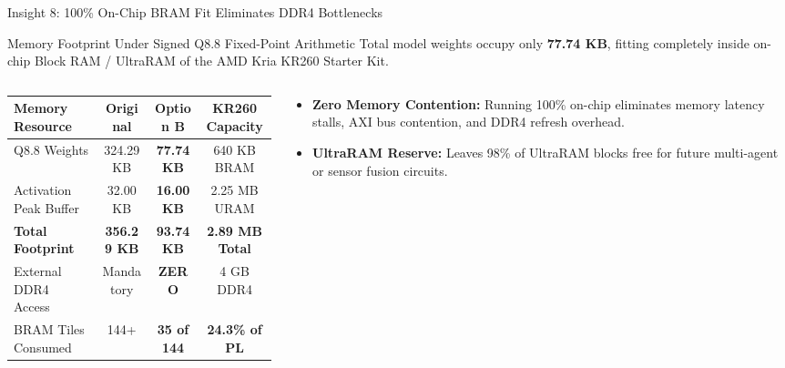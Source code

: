 \documentclass[aspectratio=169, 10pt]{beamer}
\begin{document}
\begin{frame}{Insight 8: 100\% On-Chip BRAM Fit Eliminates DDR4 Bottlenecks}
  \begin{block}{Memory Footprint Under Signed Q8.8 Fixed-Point Arithmetic}
    Total model weights occupy only \textbf{77.74 KB}, fitting completely inside on-chip Block RAM / UltraRAM of the AMD Kria KR260 Starter Kit.
  \end{block}
  \vspace{-0.2cm}
  \begin{columns}[T]
    \begin{column}{0.52\textwidth}
      \setlength{\tabcolsep}{2pt}
      \begin{table}
        \centering
        \scriptsize
        \begin{tabular}{lccc}
          \toprule
          \textbf{Memory Resource} & \textbf{Original} & \textbf{Option B} & \textbf{KR260 Capacity} \\
          \midrule
          Q8.8 Weights & 324.29 KB & \textbf{77.74 KB} & 640 KB BRAM \\
          Activation Peak Buffer & 32.00 KB & \textbf{16.00 KB} & 2.25 MB URAM \\
          \midrule
          \textbf{Total Footprint} & \textbf{356.29 KB} & \textbf{93.74 KB} & \textbf{2.89 MB Total} \\
          External DDR4 Access & Mandatory & \textbf{ZERO} & 4 GB DDR4 \\
          BRAM Tiles Consumed & 144+ & \textbf{35 of 144} & \textbf{24.3\% of PL} \\
          \bottomrule
        \end{tabular}
      \end{table}
    \end{column}
    \begin{column}{0.44\textwidth}
      \begin{itemize}
        \item \textbf{Zero Memory Contention:} Running 100\% on-chip eliminates memory latency stalls, AXI bus contention, and DDR4 refresh overhead.
        \item \textbf{UltraRAM Reserve:} Leaves 98\% of UltraRAM blocks free for future multi-agent or sensor fusion circuits.
      \end{itemize}
    \end{column}
  \end{columns}
\end{frame}
\end{document}
